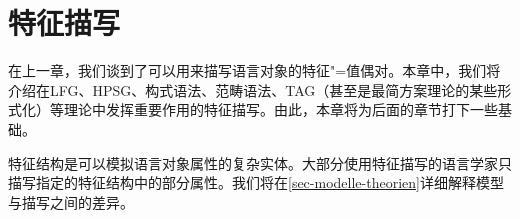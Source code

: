 

\chapter{特征描写}
\label{chap-feature-descriptions}

在上一章，我们谈到了可以用来描写语言对象的特征"=值偶对。本章中，我们将介绍在LFG、HPSG、构式语法、范畴语法、TAG（甚至是最简方案理论的某些形式化\citep{Veenstra98a}）等理论中发挥重要作用的特征描写。由此，本章将为后面的章节打下一些基础。

特征结构是可以模拟语言对象属性的复杂实体。大部分使用特征描写的语言学家只描写指定的特征结构中的部分属性。我们将在\ref{sec-modelle-theorien}详细解释模型与描写之间的差异。

